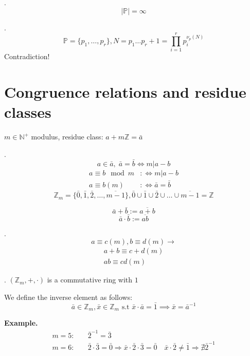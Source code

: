 \Theorem.
\[
  | \mathbb{P} | = \infty
\]

\Proof.
\[
  \mathbb{P} = \{p_1, \ldots , p_r\}, N = p_1 \ldots p_r + 1 = \prod_{i=1}^r p_i^{\nu_p(N)}
\]
Contradiction!

\section{Congruence relations and residue classes}

\begin{definition}
$m \in \mathbb{N}^{+}$ modulus, 
residue class: $a+m \mathbb{Z} = \bar{a}$ 
\end{definition}

\Remark.
\[
  a\in \bar{a},\; \bar{a} = \bar{b} \iff m | a-b
\]
\begin{align*}
  a \equiv b \mod m & :\iff m | a-b \\
  a \equiv b (m)     & :\iff \bar{a} = \bar{b}
\end{align*}
\[
  \mathbb{Z}_m = \{ \bar{0},\bar{1},\bar{2}, \ldots, \overline{m-1}\} , 
  \bar{0} \cup \bar{1} \cup \bar{2} \cup  \ldots \cup \overline{m-1} = \mathbb{Z}
\]


\begin{definition}
\[
  \bar{a} + \bar{b} := \overline{a+b}
\]
\[
  \bar{a} \cdot \bar{b} := \overline{ab}
\]
\end{definition}

\Remark.
\[
  a \equiv c(m), b \equiv d(m) \rightarrow 
\]
\begin{align*}
  a+b \equiv c+d(m) \\
  ab \equiv cd (m)
\end{align*}

\Theorem.
$(\mathbb{Z}_m, + , \cdot)$ is a commutative ring with $1$

\begin{definition}
  We define the inverse element as follows: 
\[
  \bar{a} \in \mathbb{Z}_m, \bar{x} \in \mathbb{Z}_m \text{ s.t }
  \bar{x} \cdot \bar{a} = \bar{1} \implies \bar{x} = \bar{a}^{-1}
\]
\end{definition}

\textbf{Example.}
\begin{align*}
  m = 5: &\quad \bar{2}^{-1} = \bar{3} \\
  m = 6: &\quad \bar{2}\cdot\bar{3} = \bar{0} \Rightarrow \bar{x} \cdot \bar{2} \cdot \bar{3} = \bar{0} \quad \bar{x} \cdot \bar{2} \neq \bar{1} \Rightarrow \nexists \bar{2}^{-1}
\end{align*}

